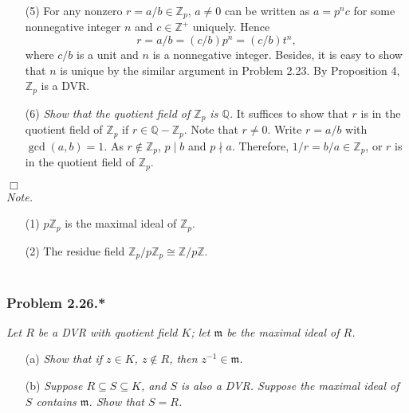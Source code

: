 \documentclass{article}
\begin{document}
\begin{enumerate}
\item[(5)]
  For any nonzero $r = a/b \in \mathbb{Z}_p$, $a \neq 0$ can be written as
  $a = p^n c$ for some nonnegative integer $n$ and $c \in \mathbb{Z}^{+}$ uniquely.
  Hence
  \[
    r = a/b = (c/b) p^n = (c/b) t^n,
  \]
  where $c/b$ is a unit and $n$ is a nonnegative integer.
  Besides, it is easy to show that $n$ is unique by the similar argument in Problem 2.23.
  By Proposition 4, $\mathbb{Z}_p$ is a DVR.

\item[(6)]
  \emph{Show that the quotient field of $\mathbb{Z}_p$ is $\mathbb{Q}$.}
  It suffices to show that $r$ is in the quotient field of $\mathbb{Z}_p$
  if $r \in \mathbb{Q} - \mathbb{Z}_p$.
  Note that $r \neq 0$.
  Write $r = a/b$ with $\gcd(a,b) = 1$.
  As $r \not\in \mathbb{Z}_p$, $p \mid b$ and $p \nmid a$.
  Therefore, $1/r = b/a \in \mathbb{Z}_p$, or $r$ is in the quotient field of $\mathbb{Z}_p$.
\end{enumerate}
$\Box$ \\

\emph{Note.}
\begin{enumerate}
\item[(1)]
  $p\mathbb{Z}_p$ is the maximal ideal of $\mathbb{Z}_p$.

\item[(2)]
  The residue field $\mathbb{Z}_p/p\mathbb{Z}_p \cong \mathbb{Z}/p\mathbb{Z}$. \\\\
\end{enumerate}






\subsubsection*{Problem 2.26.*}
\emph{Let $R$ be a DVR with quotient field $K$; let $\mathfrak{m}$ be the maximal ideal of $R$.}
\begin{enumerate}
\item[(a)]
  \emph{Show that if $z \in K$, $z \not\in R$, then $z^{-1} \in \mathfrak{m}$.}

\item[(b)]
  \emph{Suppose $R \subseteq S \subseteq K$, and $S$ is also a DVR.
  Suppose the maximal ideal of $S$ contains $\mathfrak{m}$.
  Show that $S = R$.} \\
\end{enumerate}
\end{document}
